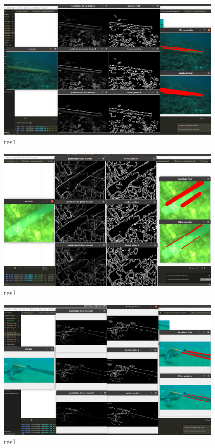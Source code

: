 \documentclass[12pt, a4paper]{article}
\begin{document}
\newpage
\begin{figure}[H]
    \includegraphics[scale=0.22]{images_doc/img6_results.png}
    \caption{res1}\label{fig:im6r}
\end{figure}
\newpage
\begin{figure}[H]
    \includegraphics[scale=0.22]{images_doc/img7_results.png}
    \caption{res1}\label{fig:im7r}
\end{figure}

\newpage
\begin{figure}[H]
    \includegraphics[scale=0.22]{images_doc/img8_results.png}
    \caption{res1}\label{fig:im8r}
\end{figure}
\end{document}
